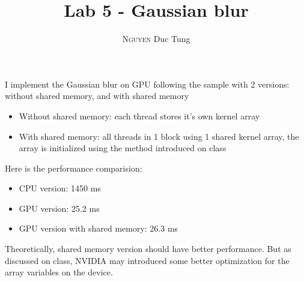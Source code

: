 \documentclass[12pt]{article}
\title{Lab 5 - Gaussian blur}
\author{\textsc{Nguyen} Duc Tung}
\date{}
\begin{document}
\maketitle

I implement the Gaussian blur on GPU following the sample with 2 versions: without shared memory, and with shared memory

\begin{itemize}
  \item Without shared memory: each thread stores it's own kernel array
  \item With shared memory: all threads in 1 block using 1 shared kernel array, the array is initialized using the method introduced on class
\end{itemize}

Here is the performance comparision:

\begin{itemize}
  \item CPU version: 1450 ms
  \item GPU version: 25.2 ms
  \item GPU version with shared memory: 26.3 ms
\end{itemize}

Theoretically, shared memory version should have better performance. But as discussed on class, NVIDIA may introduced some better optimization for the array variables on the device.
\end{document}
